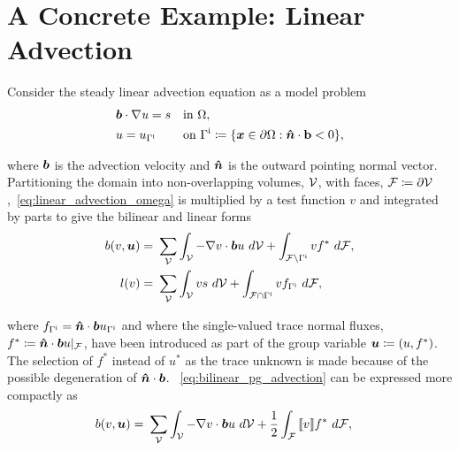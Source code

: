\section{A Concrete Example: Linear Advection}

Consider the steady linear advection equation as a model problem
\begin{subequations}
\begin{align}
& \varv{b} \cdot \nabla \vars{u} = s && \text{in}\ \Omega, \label{eq:linear_advection_omega} \\
& u = u_{\Gamma^{\text{i}}}\ && \text{on}\ \Gamma^{\text{i}} \coloneqq \{ \varv{x} \in \partial\Omega : \varv{\hat{n}} \cdot \vect{b} < 0 \},
\end{align}
\end{subequations}

where $\mathit{\bm{{b}}}$ is the advection velocity and $\mathit{\bm{{\hat{n}}}}$ is the outward pointing normal vector. Partitioning the
domain into non-overlapping volumes, $\mathcal{{{V}}}$, with faces, $\mathcal{{{F}}} \coloneqq \partial
\mathcal{{{V}}}$,~\eqref{eq:linear_advection_omega} is multiplied by a test function $v$ and integrated by parts to give the
bilinear and linear forms
\begin{subequations} \label{eq:variational_form_advection}
\begin{align}
b(v,\varg{u}) 
=\ & \sum_{\fe{V}}
\int_{\fe{V}} - \nabla v \cdot \varv{b} u\ d\fe{V} +
\int_{\fe{F} \setminus \Gamma^{\text{i}}} v f^*\ d\fe{F}, \label{eq:bilinear_pg_advection} \\
l(v)
=\ & \sum_{\fe{V}} \int_{\fe{V}} v s\ d\fe{V} + \int_{\fe{F} \cap \Gamma^{\text{i}}} v f_{\Gamma^{\text{i}}}\ d\fe{F},
\end{align}
\end{subequations}

where $f_{\Gamma^{\text{i}}} = \mathit{\bm{{\hat{n}}}} \cdot \mathit{\bm{{b}}} u_{\Gamma^{\text{i}}}$ and where the single-valued trace
normal fluxes, $f^* \coloneqq \mathit{\bm{{\hat{n}}}} \cdot \mathit{\bm{{b}}} u|_{\mathcal{{{F}}}}$, have been introduced as part of the group
variable $\mathit{\bm{{u}}} \coloneqq (u,f^*)$. The selection of $f^*$ instead of $u^*$ as the trace unknown is made because of
the possible degeneration of $\mathit{\bm{{\hat{n}}}} \cdot \mathit{\bm{{b}}}$. ~\eqref{eq:bilinear_pg_advection} can be expressed more
compactly as
\begin{align} \label{eq:bilinear_pg_advection_jump}
b(v,\varg{u}) 
=\ & \sum_{\fe{V}} \int_{\fe{V}} - \nabla v \cdot \varv{b} u\ d\fe{V}
+ \frac{1}{2} \int_{\fe{F}} \jump{v} f^*\ d\fe{F},
\end{align}


